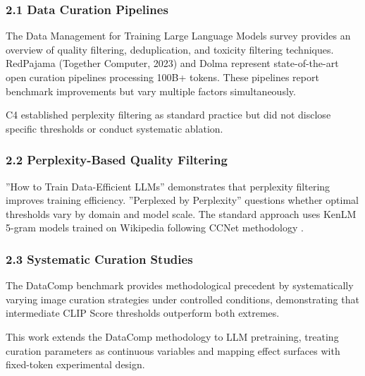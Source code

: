 
\subsubsection{2.1 Data Curation Pipelines}

The Data Management for Training Large Language Models survey \citep{zha2023data} provides an overview of quality filtering, deduplication, and toxicity filtering techniques. RedPajama (Together Computer, 2023) and Dolma \citep{soldaini2024dolma} represent state-of-the-art open curation pipelines processing 100B+ tokens. These pipelines report benchmark improvements but vary multiple factors simultaneously.

C4 \citep{raffel2020t5} established perplexity filtering as standard practice but did not disclose specific thresholds or conduct systematic ablation.

\subsubsection{2.2 Perplexity-Based Quality Filtering}

''How to Train Data-Efficient LLMs'' \citep{tirumala2024dataefficient} demonstrates that perplexity filtering improves training efficiency. ''Perplexed by Perplexity'' \citep{abbas2024perplexed} questions whether optimal thresholds vary by domain and model scale. The standard approach uses KenLM 5-gram models trained on Wikipedia following CCNet methodology \citep{wenzek2020ccnet}.

\subsubsection{2.3 Systematic Curation Studies}

The DataComp benchmark \citep{gadre2023datacomp} provides methodological precedent by systematically varying image curation strategies under controlled conditions, demonstrating that intermediate CLIP Score thresholds outperform both extremes.

This work extends the DataComp methodology to LLM pretraining, treating curation parameters as continuous variables and mapping effect surfaces with fixed-token experimental design.
